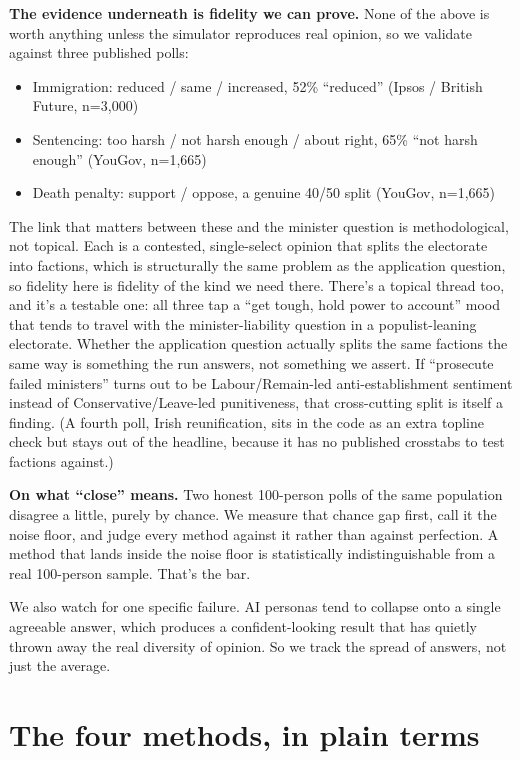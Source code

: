 \documentclass[11pt]{article}
\begin{document}
\textbf{The evidence underneath is fidelity we can prove.} None of the above is
worth anything unless the simulator reproduces real opinion, so we validate against
three published polls:
\begin{itemize}
  \item Immigration: reduced / same / increased, 52\% ``reduced'' (Ipsos / British Future, n=3{,}000)
  \item Sentencing: too harsh / not harsh enough / about right, 65\% ``not harsh enough'' (YouGov, n=1{,}665)
  \item Death penalty: support / oppose, a genuine 40/50 split (YouGov, n=1{,}665)
\end{itemize}

The link that matters between these and the minister question is methodological,
not topical. Each is a contested, single-select opinion that splits the electorate
into factions, which is structurally the same problem as the application question,
so fidelity here is fidelity of the kind we need there. There's a topical thread
too, and it's a testable one: all three tap a ``get tough, hold power to account''
mood that tends to travel with the minister-liability question in a populist-leaning
electorate. Whether the application question actually splits the same factions the
same way is something the run answers, not something we assert. If ``prosecute
failed ministers'' turns out to be Labour/Remain-led anti-establishment sentiment
instead of Conservative/Leave-led punitiveness, that cross-cutting split is itself a
finding. (A fourth poll, Irish reunification, sits in the code as an extra topline
check but stays out of the headline, because it has no published crosstabs to test
factions against.)

\textbf{On what ``close'' means.} Two honest 100-person polls of the same
population disagree a little, purely by chance. We measure that chance gap first,
call it the noise floor, and judge every method against it rather than against
perfection. A method that lands inside the noise floor is statistically
indistinguishable from a real 100-person sample. That's the bar.

We also watch for one specific failure. AI personas tend to collapse onto a single
agreeable answer, which produces a confident-looking result that has quietly thrown
away the real diversity of opinion. So we track the spread of answers, not just the
average.

\section*{The four methods, in plain terms}
\end{document}

